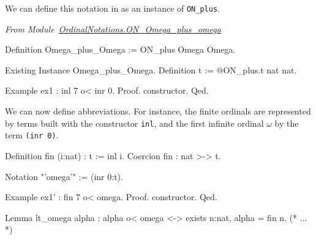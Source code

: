 We can define this notation in \coq{} as an instance of \texttt{ON\_plus}.


\vspace{4pt}
\noindent\emph{From Module~\href{../theories/html/hydras.OrdinalNotations.ON_Omega_plus_omega.html}{OrdinalNotations.ON\_Omega\_plus\_omega}}

\begin{Coqsrc}
Definition Omega_plus_Omega := ON_plus Omega Omega.

Existing Instance Omega_plus_Omega.
Definition t := @ON_plus.t nat nat.
\end{Coqsrc}

\begin{Coqsrc}
Example ex1 : inl 7 o< inr 0.
Proof. constructor. Qed.
\end{Coqsrc}

We can now define abbreviations. For instance, the finite ordinals are represented by terms built with  the constructor \texttt{inl}, and the first infinite ordinal $\omega$ by the term \texttt{(inr 0)}.

\begin{Coqsrc}
Definition fin (i:nat) : t := inl i.
Coercion fin : nat >-> t.

Notation "'omega'" := (inr  0:t).
\end{Coqsrc}

\begin{Coqsrc}
Example ex1' : fin 7 o< omega.
Proof. constructor. Qed.

Lemma lt_omega alpha : 
     alpha o< omega <-> exists n:nat,  alpha = fin n.
(* ... *)
\end{Coqsrc}





  



